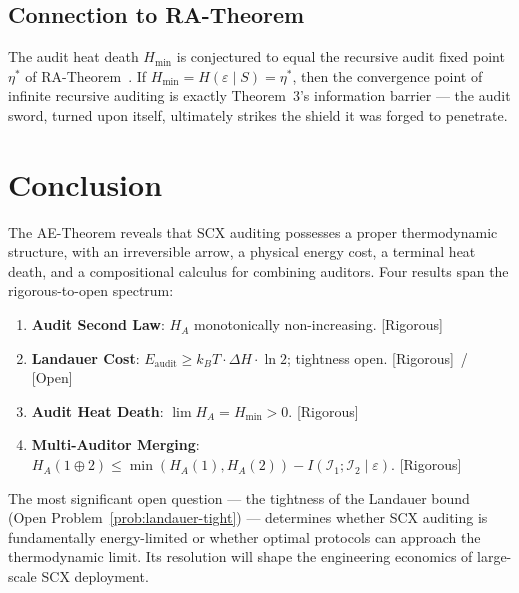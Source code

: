 \documentclass[12pt,a4paper]{article}
\newcommand{\rigorous}{\textcolor{green!50!black}{\small\textsf{[Rigorous]}}}
\newcommand{\openquest}{\textcolor{red!70!black}{\small\textsf{[Open]}}}
\newcommand{\cI}{\mathcal{I}}
\begin{document}
\subsection{Connection to RA-Theorem}

The audit heat death $H_{\min}$ is conjectured to equal the recursive audit
fixed point $\eta^*$ of RA-Theorem~\citep{scx2024ra}.  If
$H_{\min}=H(\varepsilon\mid S)=\eta^*$, then the convergence point of infinite
recursive auditing is exactly Theorem~3's information barrier — the audit sword,
turned upon itself, ultimately strikes the shield it was forged to penetrate.

\section{Conclusion}

The AE-Theorem reveals that SCX auditing possesses a proper thermodynamic
structure, with an irreversible arrow, a physical energy cost, a terminal
heat death, and a compositional calculus for combining auditors.  Four results
span the rigorous-to-open spectrum:

\begin{enumerate}[label=(\arabic*)]
    \item \textbf{Audit Second Law}: $H_A$ monotonically non-increasing.  \rigorous
    \item \textbf{Landauer Cost}: $E_{\mathrm{audit}}\geq k_B T\cdot\Delta H\cdot\ln2$;
          tightness open.  \rigorous~/ \openquest
    \item \textbf{Audit Heat Death}: $\lim H_A = H_{\min} > 0$.  \rigorous
    \item \textbf{Multi-Auditor Merging}: $H_A(1\oplus2)\leq\min(H_A(1),H_A(2))-I(\cI_1;\cI_2\mid\varepsilon)$.
          \rigorous
\end{enumerate}

The most significant open question — the tightness of the Landauer bound
(Open Problem~\ref{prob:landauer-tight}) — determines whether SCX auditing is
fundamentally energy-limited or whether optimal protocols can approach the
thermodynamic limit.  Its resolution will shape the engineering economics of
large-scale SCX deployment.
\end{document}
